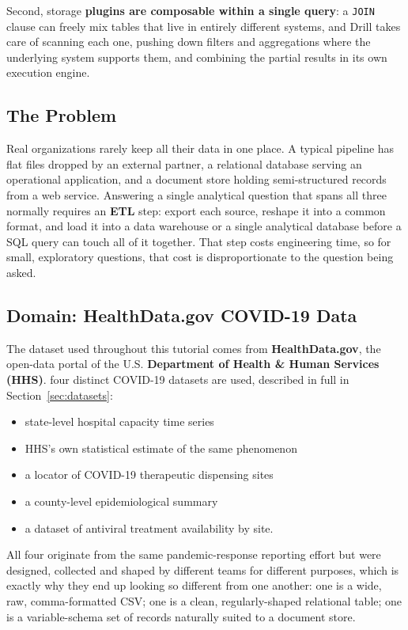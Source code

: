 \documentclass[11pt,a4paper]{article}
\begin{document}
Second, storage\textbf{ plugins are composable within a single query}: a \texttt{JOIN} clause can freely mix tables that live in entirely different systems, and Drill takes care of scanning each one, pushing down filters and aggregations where the underlying system supports them, and combining the partial results in its own execution engine.

\subsection{The Problem}

Real organizations rarely keep all their data in one place. A typical pipeline has
flat files dropped by an external partner, a relational database serving an
operational application, and a document store holding semi-structured records from a
web service. 
Answering a single analytical question that spans all three normally
requires an \textbf{ETL }step: export each source, reshape it into a common format, and load it
into a data warehouse or a single analytical database before a SQL query can touch all
of it together. That step costs engineering time, so  for small,  exploratory
questions, that cost is disproportionate to the question being asked.

\subsection{Domain: HealthData.gov COVID-19 Data}

The dataset used throughout this tutorial comes from
\textbf{HealthData.gov}, the open-data portal of the U.S.
\textbf{Department of Health \& Human Services (HHS)}. four distinct COVID-19 datasets are
used, described in full in Section~\ref{sec:datasets}: 
\begin{itemize}
    \item state-level hospital capacity
time series
\item  HHS's own statistical estimate of the same phenomenon
\item a locator of
COVID-19 therapeutic dispensing sites
\item  a county-level epidemiological summary
\item a dataset of antiviral treatment availability by site.
\end{itemize}

All four originate from the same
pandemic-response reporting effort but were designed, collected and shaped by
different teams for different purposes, which is exactly why they end up looking so
different from one another: one is a wide, raw, comma-formatted CSV; one is a clean,
regularly-shaped relational table; one is a variable-schema set of records naturally
suited to a document store.
\end{document}
